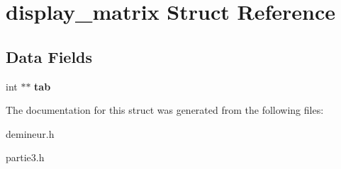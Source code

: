 \hypertarget{structdisplay__matrix}{
\section{display\_\-matrix Struct Reference}
\label{structdisplay__matrix}
}
\subsection*{Data Fields}
\begin{DoxyCompactItemize}
\item 
\hypertarget{structdisplay__matrix_aaae5c9ab5fdfdc125442c0df7e4a8d85}{
int $\ast$$\ast$ {\bfseries tab}}
\label{structdisplay__matrix_aaae5c9ab5fdfdc125442c0df7e4a8d85}

\end{DoxyCompactItemize}


The documentation for this struct was generated from the following files:\begin{DoxyCompactItemize}
\item 
demineur.h\item 
partie3.h\end{DoxyCompactItemize}
